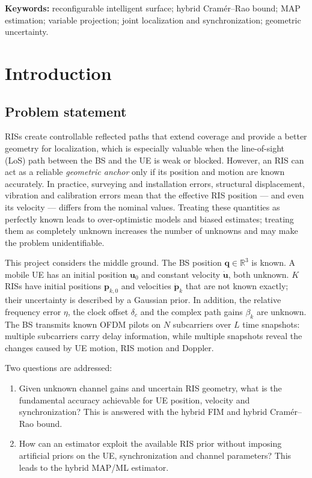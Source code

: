 \documentclass[11pt,a4paper]{article}
\newcommand{\vect}[1]{\bm{#1}}
\newcommand{\udot}{\dot{\vect{u}}}
\newcommand{\pdot}{\dot{\vect{p}}}
\begin{document}
\noindent\textbf{Keywords:} reconfigurable intelligent surface; hybrid Cram\'er--Rao bound; MAP estimation;
variable projection; joint localization and synchronization; geometric uncertainty.

\tableofcontents
\newpage

\section{Introduction}

\subsection{Problem statement}
RISs create controllable reflected paths that extend coverage and provide a better geometry for localization,
which is especially valuable when the line-of-sight (LoS) path between the BS and the UE is weak or blocked.
However, an RIS can act as a reliable \emph{geometric anchor} only if its position and motion are known
accurately. In practice, surveying and installation errors, structural displacement, vibration and calibration
errors mean that the effective RIS position --- and even its velocity --- differs from the nominal values.
Treating these quantities as perfectly known leads to over-optimistic models and biased estimates; treating them
as completely unknown increases the number of unknowns and may make the problem unidentifiable.

This project considers the middle ground. The BS position $\vect{q}\in\mathbb{R}^3$ is known. A mobile UE has an
initial position $\vect{u}_0$ and constant velocity $\udot$, both unknown. $K$ RISs have initial positions
$\vect{p}_{k,0}$ and velocities $\pdot_k$ that are not known exactly; their uncertainty is described by a
Gaussian prior. In addition, the relative frequency error $\eta$, the clock offset $\delta_c$ and the complex path
gains $\beta_k$ are unknown. The BS transmits known OFDM pilots on $N$ subcarriers over $L$ time snapshots:
multiple subcarriers carry delay information, while multiple snapshots reveal the changes caused by UE motion,
RIS motion and Doppler.

Two questions are addressed:
\begin{enumerate}
\item Given unknown channel gains and uncertain RIS geometry, what is the fundamental accuracy achievable for UE
position, velocity and synchronization? This is answered with the hybrid FIM and hybrid Cram\'er--Rao bound.
\item How can an estimator exploit the available RIS prior without imposing artificial priors on the UE,
synchronization and channel parameters? This leads to the hybrid MAP/ML estimator.
\end{enumerate}
\end{document}

